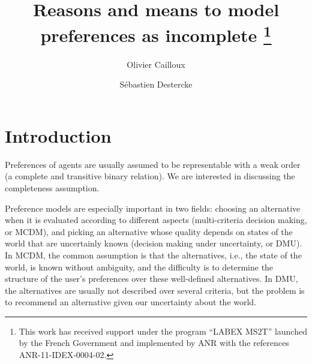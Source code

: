 \documentclass[french, english]{llncs}
\begin{document}
\title{%
	\texorpdfstring{%
		Reasons and means to model preferences as incomplete%
		\thanks{This work has received support under the program “LABEX MS2T” launched by the French Government and implemented by ANR with the references ANR-11-IDEX-0004-02.}
	}{Reasons and means to model preferences as incomplete%
	}
}
\author{Olivier Cailloux \and Sébastien Destercke}
\maketitle

	
\setlength{\parindent}{1.5em}

\section{Introduction}\label{sec:intro}
Preferences of agents are usually assumed to be representable with a weak order (a complete and transitive binary relation). We are interested in discussing the completeness assumption. 
	
Preference models are especially important in two fields: choosing an alternative when it is evaluated according to different aspects (multi-criteria decision making, or MCDM), and picking an alternative whose quality depends on states of the world that are uncertainly known (decision making under uncertainty, or DMU).
In MCDM, the common assumption is that the alternatives, i.e., the state of the world, is known without ambiguity, and the difficulty is to determine the structure of the user’s preferences over these well-defined alternatives. In DMU, the alternatives are usually not described over several criteria, but the problem is to recommend an alternative given our uncertainty about the world. 
	
\end{document}

